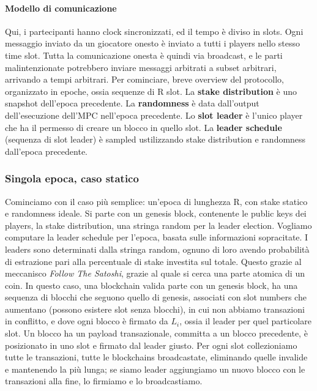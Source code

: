 \documentclass[11pt]{article}
\begin{document}
\paragraph{Modello di comunicazione} Qui, i partecipanti hanno clock sincronizzati, ed il tempo è diviso in slots. Ogni messaggio inviato da un giocatore onesto è inviato a tutti i players nello stesso time slot. Tutta la comunicazione onesta è quindi via broadcast, e le parti malintenzionate potrebbero inviare messaggi arbitrati a subset arbitrari, arrivando a tempi arbitrari. Per cominciare, breve overview del protocollo, organizzato in epoche, ossia sequenze di R slot. La \textbf{stake distribution} è uno snapshot dell'epoca precedente. La \textbf{randomness} è data dall'output dell'esecuzione dell'MPC nell'epoca precedente. Lo \textbf{slot leader} è l'unico player che ha il permesso di creare un blocco in quello slot. La \textbf{leader schedule} (sequenza di slot leader) è sampled ustilizzando stake distribution e randomness dall'epoca precedente.
\subsubsection{Singola epoca, caso statico}
Cominciamo con il caso più semplice: un'epoca di lunghezza R, con stake statico e randomness ideale. Si parte con un genesis block, contenente le public keys dei players, la stake distribution, una stringa random per la leader election. Vogliamo computare la leader schedule per l'epoca, basata sulle informazioni sopracitate. I leaders sono determinati dalla stringa random, ognuno di loro avendo probabilità di estrazione pari alla percentuale di stake investita sul totale. Questo grazie al meccanisco \textit{Follow The Satoshi}, grazie al quale si cerca una parte atomica di un coin. In questo caso, una blockchain valida parte con un genesis block, ha una sequenza di blocchi che seguono quello di genesis, associati con slot numbers che aumentano (possono esistere slot senza blocchi), in cui non abbiamo transazioni in conflitto, e dove ogni blocco è firmato da $L_i$, ossia il leader per quel particolare slot. Un blocco ha un payload transazionale, committa a un blocco precedente, è posizionato in uno slot e firmato dal leader giusto. Per ogni slot collezioniamo tutte le transazioni, tutte le blockchains broadcastate, eliminando quelle invalide e mantenendo la più lunga; se siamo leader aggiungiamo un nuovo blocco con le transazioni alla fine, lo firmiamo e lo broadcastiamo. 
\end{document}
